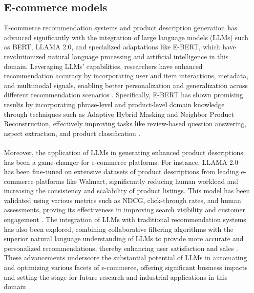 \subsection*{E-commerce models}
E-commerce recommendation systems and product description generation has advanced significantly with the integration of large language models (LLMs) such as BERT, LLAMA 2.0, and specialized adaptations like E-BERT, which have revolutionized natural language processing and artificial intelligence in this domain. Leveraging LLMs' capabilities, researchers have enhanced recommendation accuracy by incorporating user and item interactions, metadata, and multimodal signals, enabling better personalization and generalization across different recommendation scenarios \cite{xu2024emerging}. Specifically, E-BERT has shown promising results by incorporating phrase-level and product-level domain knowledge through techniques such as Adaptive Hybrid Masking and Neighbor Product Reconstruction, effectively improving tasks like review-based question answering, aspect extraction, and product classification \cite{zhang2021ebert}.
\\\\
Moreover, the application of LLMs in generating enhanced product descriptions has been a game-changer for e-commerce platforms. For instance, LLAMA 2.0 has been fine-tuned on extensive datasets of product descriptions from leading e-commerce platforms like Walmart, significantly reducing human workload and increasing the consistency and scalability of product listings. This model has been validated using various metrics such as NDCG, click-through rates, and human assessments, proving its effectiveness in improving search visibility and customer engagement \cite{zhou2023leveraging}. The integration of LLMs with traditional recommendation systems has also been explored, combining collaborative filtering algorithms with the superior natural language understanding of LLMs to provide more accurate and personalized recommendations, thereby enhancing user satisfaction and sales \cite{xu2024emerging}. These advancements underscore the substantial potential of LLMs in automating and optimizing various facets of e-commerce, offering significant business impacts and setting the stage for future research and industrial applications in this domain \cite{zhou2023leveraging}.



